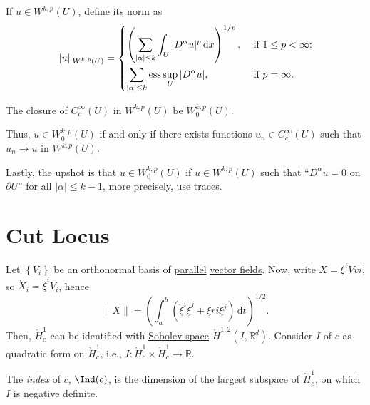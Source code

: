 \begin{definition}
	If \(u\in W^{k, p}(U)\), define its norm as
	\[
		\lVert u \rVert_{W^{k, p}(U)} = \begin{dcases}
			\left( \sum_{\vert \alpha \vert \leq k} \int _U \vert D^\alpha u \vert ^p \,\mathrm{d} x \right)^{1 / p} , & \text{ if } 1 \leq p < \infty ; \\
			\sum_{\vert \alpha \vert \leq k} \mathrm{ess} \sup _U \vert D^\alpha u \vert ,                             & \text{ if } p = \infty .
		\end{dcases}
	\]
\end{definition}

\begin{notation}
	The closure of \(C_c^{\infty} (U)\) in \(W^{k, p}(U)\) be \(W_0^{k, p}(U)\).
\end{notation}

Thus, \(u\in W_0^{k, p}(U)\) if and only if there exists functions \(u_n \in C_c^{\infty} (U)\) such that \(u_n \to u\) in \(W^{k, p}(U)\).

\begin{remark}
	Lastly, the upshot is that \(u\in W^{k, p}_0(U)\) if \(u\in W^{k, p}(U)\) such that ``\(D^\alpha u=0\) on \(\partial U\)'' for all \(\vert \alpha \vert \leq k - 1\), more precisely, use traces.
\end{remark}

\section{Cut Locus}
Let \(\left\{ V_i \right\} \) be an orthonormal basis of \hyperref[def:parallel]{parallel} \hyperref[def:vector-field]{vector fields}. Now, write \(X = \xi ^i Vvi\), so \(\dot{X} _i = \dot{\xi }^i V_i \), hence
\[
	\lVert X \rVert = \left( \int_{a}^{b} \left( \dot{\xi }^i \dot{\xi }^j + \xi ri \xi ^j \right)  \,\mathrm{d}t \right) ^{1 / 2}.
\]
Then, \(\mathring{H}_c^1\) can be identified with \hyperref[def:Sobolev-space]{Sobolev space} \(\mathring{H}^{1, 2}(I, \mathbb{R} ^d)\). Consider \(I\) of \(c\) as quadratic form on \(\mathring{H}^1_c \), i.e., \(I\colon \mathring{H}^1_c \times \mathring{H}^1_c \to \mathbb{R} \).

\begin{definition}[Index]\label{def:index}
	The \emph{index} of \(c\), \(\Ind(c)\), is the dimension of the largest subspace of \(\mathring{H}_c^1\), on which \(I\) is negative definite.
\end{definition}


